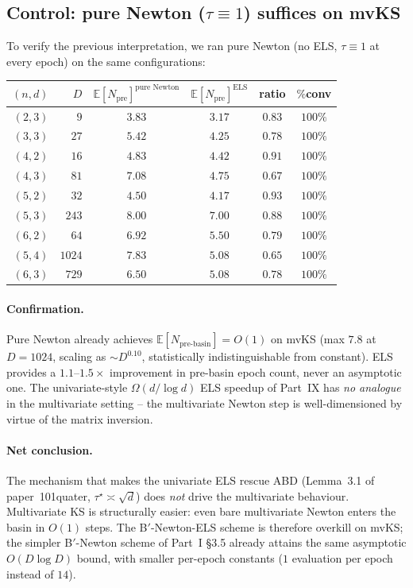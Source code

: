 \documentclass[11pt,a4paper]{article}
\begin{document}
\subsection{Control: pure Newton ($\tau \equiv 1$) suffices on mvKS}

To verify the previous interpretation, we ran pure Newton (no ELS, $\tau \equiv 1$ at every epoch) on the same configurations:

\begin{center}
\begin{tabular}{rrcccc}
\toprule
$(n, d)$ & $D$ & $\mathbb{E}[N_{\text{pre}}]^{\text{pure Newton}}$ & $\mathbb{E}[N_{\text{pre}}]^{\text{ELS}}$ & ratio & $\%$conv \\
\midrule
$(2, 3)$ & $9$    & $3.83$ & $3.17$ & $0.83$ & $100\%$ \\
$(3, 3)$ & $27$   & $5.42$ & $4.25$ & $0.78$ & $100\%$ \\
$(4, 2)$ & $16$   & $4.83$ & $4.42$ & $0.91$ & $100\%$ \\
$(4, 3)$ & $81$   & $7.08$ & $4.75$ & $0.67$ & $100\%$ \\
$(5, 2)$ & $32$   & $4.50$ & $4.17$ & $0.93$ & $100\%$ \\
$(5, 3)$ & $243$  & $8.00$ & $7.00$ & $0.88$ & $100\%$ \\
$(6, 2)$ & $64$   & $6.92$ & $5.50$ & $0.79$ & $100\%$ \\
$(5, 4)$ & $1024$ & $7.83$ & $5.08$ & $0.65$ & $100\%$ \\
$(6, 3)$ & $729$  & $6.50$ & $5.08$ & $0.78$ & $100\%$ \\
\bottomrule
\end{tabular}
\end{center}

\paragraph{Confirmation.}
Pure Newton already achieves $\mathbb{E}[N_{\text{pre-basin}}] = O(1)$ on mvKS (max $7.8$ at $D = 1024$, scaling as $\sim D^{0.10}$, statistically indistinguishable from constant). ELS provides a $1.1$--$1.5\times$ improvement in pre-basin epoch count, never an asymptotic one. The univariate-style $\Omega(d/\log d)$ ELS speedup of Part~IX has \emph{no analogue} in the multivariate setting -- the multivariate Newton step is well-dimensioned by virtue of the matrix inversion.

\paragraph{Net conclusion.}
The mechanism that makes the univariate ELS rescue ABD (Lemma~3.1 of paper~101quater, $\tau^\star \asymp \sqrt d$) does \emph{not} drive the multivariate behaviour. Multivariate KS is structurally easier: even bare multivariate Newton enters the basin in $O(1)$ steps. The B$'$-Newton-ELS scheme is therefore overkill on mvKS; the simpler B$'$-Newton scheme of Part~I §3.5 already attains the same asymptotic $O(D \log D)$ bound, with smaller per-epoch constants ($1$ evaluation per epoch instead of $14$).
\end{document}
